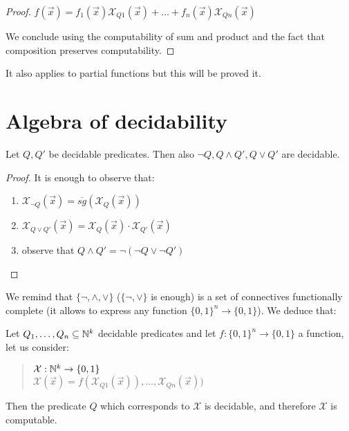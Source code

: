 \begin{proof}
$f(\vec{x}) = f_1(\vec{x})\mathcal{X}_{Q1}(\vec{x}) + \dots + f_n(\vec{x})\mathcal{X}_{Qn}(\vec{x})$

We conclude using the computability of sum and product and the fact that composition preserves computability.
\end{proof}

It also applies to partial functions but this  will be proved it.



\section{Algebra of decidability}

\begin{lemma}
  Let $Q, Q'$ be  decidable predicates.  Then also $\neg Q, Q \wedge Q', Q \vee Q'$ are decidable.
\end{lemma}

\begin{proof}
It is enough to observe that:
\begin{enumerate}
\item $\mathcal{X}_{\lnot Q}(\vec{x}) =  \overline{sg}(\mathcal{X}_Q(\vec{x}))$
\item $\mathcal{X}_{Q \vee Q'}(\vec{x}) = \mathcal{X}_{Q}(\vec{x}) \cdot \mathcal{X}_{Q'}(\vec{x})$
\item observe that $Q \wedge Q' = \lnot (\lnot Q \vee \lnot Q')$
\end{enumerate}
\end{proof}

We remind that $\{\neg, \wedge, \vee \}$ ($\{\neg, \vee \}$ is enough) is a set of connectives functionally complete (it allows to express any function $\{0,1\}^n \rightarrow \{0,1\}$). We deduce that:

\begin{corollary}
  Let $Q_1, \dots, Q_n \subseteq \mathbb{N}^k$ decidable predicates and let $f:\{0,1\}^n \rightarrow \{0,1\}$ a function, let us consider:
  \begin{quote}
    $\mathcal{X}: \mathbb{N}^k\rightarrow\{0,1\}$\\
    $\mathcal{X}(\vec{x}) = f(\mathcal{X}_{Q1}(\vec{x})), \dots, \mathcal{X}_{Qn}(\vec{x}) )$
  \end{quote}
  Then the predicate $Q$ which corresponds to $\mathcal{X}$ is
  decidable, and therefore $\mathcal{X}$ is computable.
\end{corollary}

